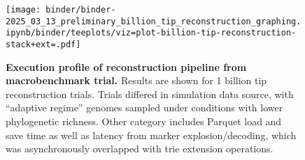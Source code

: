 \begin{figure}[h]
\centering
\texttt{[image: binder/binder-2025\_03\_13\_preliminary\_billion\_tip\_reconstruction\_graphing.ipynb/binder/teeplots/viz=plot-billion-tip-reconstruction-stack+ext=.pdf]}
\vspace{-1em}
\caption{%
\textbf{Execution profile of reconstruction pipeline from macrobenchmark trial.}
\small
Results are shown for 1 billion tip reconstruction trials.
Trials differed in simulation data source, with ``adaptive regime'' genomes sampled under conditions with lower phylogenetic richness.
Other category includes Parquet load and save time as well as latency from marker explosion/decoding, which was asynchronously overlapped with trie extension operations.
}
\label{fig:billion-tip-time}
\vspace{-1.5em}
\end{figure}
